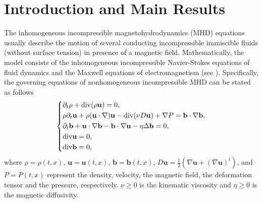\documentclass[11pt]{article}
\newcommand{\Dv}{{\rm div}}
\numberwithin{equation}{section}
\begin{document}
\section{Introduction and Main Results}
\label{pro}
The inhomogeneous  incompressible magnetohydrodynamics (MHD) equations usually describe  the motion of several conducting incompressible immiscible fluids (without surface tension) in presence of a magnetic field.
Mathematically, the model consists of the inhomogeneous  incompressible
Navier-Stokes equations of fluid dynamics and the Maxwell equations of
electromagnetism (see \cite{JCT,KL}). Specifically, the governing equations of nonhomogeneous incompressible MHD can be stated as follows
\begin{align} \label{1.0MHD}
\left\{
\begin{aligned}
&\partial_{t}\rho+\Dv (\rho\mathbf{u})=0,\\
&\rho\partial_{t}\mathbf{u}+\rho(\mathbf{u}\cdot\nabla)\mathbf{u}
-\Dv(\nu D\mathbf{u})+\nabla P
=\mathbf{b}\cdot\nabla \mathbf{b},\\
&\partial_{t}\mathbf{b}+\mathbf{u}\cdot\nabla \mathbf{b}-\mathbf{b}\cdot\nabla\mathbf{u}-\eta\Delta \mathbf{b}=0, \\
&\Dv \mathbf{u}=0,\\
&\Dv \mathbf{b}=0,
\end{aligned}
\right.
\end{align}
where $\rho = \rho(t, x)$, $\boldsymbol{u} = \boldsymbol{u}(t, x)$, $\boldsymbol{b} = \boldsymbol{b}(t, x)$, $ D \mathbf{u} = \frac{1}{2} ( \nabla \mathbf{u} + ( \nabla \mathbf{u} )^t )$,  and $P = P(t, x)$ represent the density, velocity, the magnetic field,  the deformation tensor  and the pressure, respectively.  $\nu\geq0$ is the kinematic viscosity and $\eta\geq0$ is the magnetic diffusivity.
\end{document}
